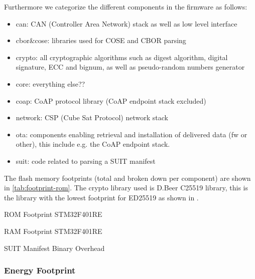 Furthermore we categorize the different components in the firmware as follows:

\begin{itemize}
    \item can: CAN (Controller Area Network) stack as well as low level interface
    \item cbor\&cose: libraries used for COSE and CBOR parsing
    \item crypto: all cryptographic algorithms such as digest algorithm, digital
    signature, ECC and bignum, as well as pseudo-random numbers generator
    \item core: everything else??
    \item coap: CoAP protocol library (CoAP endpoint stack excluded)
    \item network: CSP (Cube Sat Protocol) network stack
    \item ota: components enabling retrieval and installation of delivered data
    (fw or other), this include e.g. the CoAP endpoint stack.
    \item suit: code related to parsing a SUIT manifest
\end{itemize}

The flash memory footprints (total and broken down per component) are shown in
\ref*{tab:footprint-rom}. The crypto library used is D.Beer C25519 library, this
is the library with the lowest footprint for ED25519 as shown in \cite{zandberg2019secure}.

\begin{table}[ht]
    \caption{ROM Footprint STM32F401RE}
    \label{tab:footprint-rom}
    \centering
    
\end{table}
\begin{table}[ht]
    \caption{RAM Footprint STM32F401RE}
    \label{tab:footprin-ram}
    \centering
    
\end{table}

\begin{table}[ht]
    \caption{SUIT Manifest Binary Overhead}
    \label{tab:manifest-overhead}
    \centering
    
\end{table}

\subsubsection{Energy Footprint}

